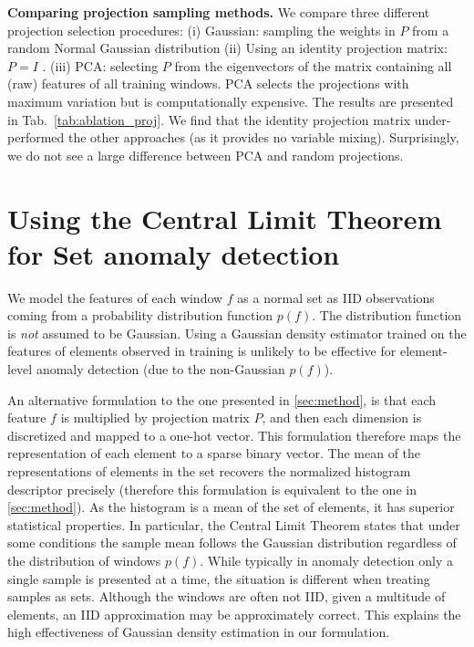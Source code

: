 \documentclass{article}
\begin{document}
\textbf{Comparing projection sampling methods.} We compare three different projection selection procedures: (i) Gaussian: sampling the weights in $P$ from a random Normal Gaussian distribution (ii) Using an identity projection matrix: $P = I$ . (iii) PCA: selecting $P$ from the eigenvectors of the matrix containing all (raw) features of all training windows. PCA selects the projections with maximum variation but is computationally expensive. The results are presented in Tab.~\ref{tab:ablation_proj}. We find that the identity projection matrix under-performed the other approaches (as it provides no variable mixing). Surprisingly, we do not see a large difference between PCA and random projections.     

\section{Using the Central Limit Theorem for Set anomaly detection}
\label{app:gaussian}
We model the features of each window $f$ as a normal set as IID observations coming from a probability distribution function $p(f)$. The distribution function is \textit{not} assumed to be Gaussian. Using a Gaussian density estimator trained on the features of elements observed in training is unlikely to be effective for element-level anomaly detection (due to the non-Gaussian $p(f)$). 

An alternative formulation to the one presented in \cref{sec:method}, is that each feature $f$ is multiplied by projection matrix $P$, and then each dimension is discretized and mapped to a one-hot vector. This formulation therefore maps the representation of each element to a sparse binary vector. The mean of the representations of elements in the set recovers the normalized histogram descriptor precisely (therefore this formulation is equivalent to the one in \cref{sec:method}).
As the histogram is a mean of the set of elements, it has superior statistical properties. In particular, the Central Limit Theorem states that under some conditions the sample mean follows the Gaussian distribution regardless of the distribution of windows $p(f)$. While typically in anomaly detection only a single sample is presented at a time, the situation is different when treating samples as sets. Although the windows are often not IID, given a multitude of elements, an IID approximation may be approximately correct. This explains the high effectiveness of Gaussian density estimation in our formulation.
\end{document}
